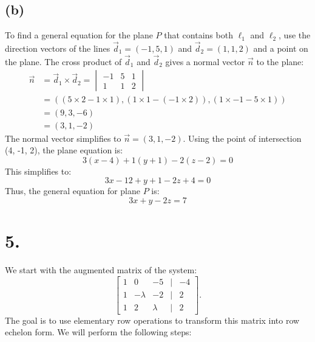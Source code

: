 \documentclass{article}
\begin{document}
        \subsection*{(b)}
        To find a general equation for the plane \(P\) that contains both \(\ell_1\) and \(\ell_2\), use the direction vectors of the lines \(\vec{d}_1 = (-1, 5, 1)\) and \(\vec{d}_2 = (1, 1, 2)\) and a point on the plane. The cross product of \(\vec{d}_1\) and \(\vec{d}_2\) gives a normal vector \(\vec{n}\) to the plane:
        \begin{align}
            \vec{n} &= \vec{d}_1 \times \vec{d}_2 = \begin{vmatrix}
                -1 & 5 & 1 \\
                1 & 1 & 2 
                \end{vmatrix} \\
                &= \left((5 \times 2 - 1 \times 1), (1 \times 1 - (-1 \times 2)), (1 \times -1 - 5 \times 1)\right) \\
                &= (9, 3, -6) \\
                &= (3, 1, -2)
        \end{align}
        The normal vector simplifies to \(\vec{n} = (3, 1, -2)\). Using the point of intersection (4, -1, 2), the plane equation is:
        \[
        3(x - 4) + 1(y + 1) - 2(z - 2) = 0
        \]
        This simplifies to:
        \[
        3x - 12 + y + 1 - 2z + 4 = 0
        \]
        Thus, the general equation for plane \(P\) is:
        \[
        3x + y - 2z = 7
        \]
        \newpage
        \section*{5.}
        We start with the augmented matrix of the system:
        \[
        \begin{bmatrix}
        1 & 0 & -5 & | & -4 \\
        1 & -\lambda & -2 & | & 2 \\
        1 & 2 & \lambda & | & 2
        \end{bmatrix}.
        \]
        The goal is to use elementary row operations to transform this matrix into row echelon form. We will perform the following steps:
        
\end{document}
